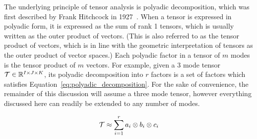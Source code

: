 \documentclass[../dissertation.tex]{subfiles}
\begin{document}
The underlying principle of tensor analysis is polyadic decomposition,
which was first described by Frank Hitchcock in
1927~\cite{hitchcock1927}.  When a tensor is expressed in polyadic
form, it is expressed as the sum of rank 1 tensors, which is usually
written as the outer product of vectors.  (This is also referred to as
the tensor product of vectors, which is in line with the geometric
interpretation of tensors as the outer product of vector spaces.)
Each polyadic factor in a tensor of $m$ modes is the tensor product of
$m$ vectors.  For example, given a 3 mode tensor $\mathcal{T} \in
\mathbb{R}^{I\times J \times K}$, its polyadic decomposition into $r$ factors
is a set of factors which satisfies
Equation~\ref{eq:polyadic_decomposition}.  For the sake of
convenience, the remainder of this discussion will assume a three
mode tensor, however everything discussed here can readily be extended
to any number of modes.

\begin{equation} \label{eq:polyadic_decomposition}
  \mathcal{T} \approx \displaystyle\sum_{i=1}^{r} a_i \otimes b_i
  \otimes c_i
\end{equation}
\end{document}

